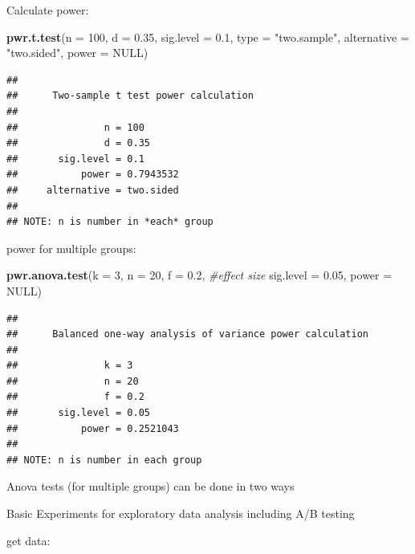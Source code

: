 \documentclass[]{book}
\newenvironment{Shaded}{\begin{snugshade}}{\end{snugshade}}
\newcommand{\CommentTok}[1]{\textcolor[rgb]{0.56,0.35,0.01}{\textit{#1}}}
\newcommand{\DataTypeTok}[1]{\textcolor[rgb]{0.13,0.29,0.53}{#1}}
\newcommand{\DecValTok}[1]{\textcolor[rgb]{0.00,0.00,0.81}{#1}}
\newcommand{\FloatTok}[1]{\textcolor[rgb]{0.00,0.00,0.81}{#1}}
\newcommand{\KeywordTok}[1]{\textcolor[rgb]{0.13,0.29,0.53}{\textbf{#1}}}
\newcommand{\NormalTok}[1]{#1}
\newcommand{\OperatorTok}[1]{\textcolor[rgb]{0.81,0.36,0.00}{\textbf{#1}}}
\newcommand{\OtherTok}[1]{\textcolor[rgb]{0.56,0.35,0.01}{#1}}
\newcommand{\StringTok}[1]{\textcolor[rgb]{0.31,0.60,0.02}{#1}}
\begin{document}
Calculate power:

\begin{Shaded}
\begin{Highlighting}[]
\KeywordTok{pwr.t.test}\NormalTok{(}\DataTypeTok{n =} \DecValTok{100}\NormalTok{,}
           \DataTypeTok{d =} \FloatTok{0.35}\NormalTok{,}
           \DataTypeTok{sig.level =} \FloatTok{0.1}\NormalTok{,}
           \DataTypeTok{type =} \StringTok{"two.sample"}\NormalTok{,}
           \DataTypeTok{alternative =} \StringTok{"two.sided"}\NormalTok{,}
           \DataTypeTok{power =} \OtherTok{NULL}\NormalTok{)}
\end{Highlighting}
\end{Shaded}

\begin{verbatim}
## 
##      Two-sample t test power calculation 
## 
##               n = 100
##               d = 0.35
##       sig.level = 0.1
##           power = 0.7943532
##     alternative = two.sided
## 
## NOTE: n is number in *each* group
\end{verbatim}

power for multiple groups:

\begin{Shaded}
\begin{Highlighting}[]
\KeywordTok{pwr.anova.test}\NormalTok{(}\DataTypeTok{k =} \DecValTok{3}\NormalTok{,}
               \DataTypeTok{n =} \DecValTok{20}\NormalTok{,}
               \DataTypeTok{f =} \FloatTok{0.2}\NormalTok{, }\CommentTok{#effect size}
               \DataTypeTok{sig.level =} \FloatTok{0.05}\NormalTok{,}
               \DataTypeTok{power =} \OtherTok{NULL}\NormalTok{)}
\end{Highlighting}
\end{Shaded}

\begin{verbatim}
## 
##      Balanced one-way analysis of variance power calculation 
## 
##               k = 3
##               n = 20
##               f = 0.2
##       sig.level = 0.05
##           power = 0.2521043
## 
## NOTE: n is number in each group
\end{verbatim}

Anova tests (for multiple groups) can be done in two ways

Basic Experiments for exploratory data analysis including A/B testing

get data:

\begin{Shaded}
\end{Shaded}
\end{document}
